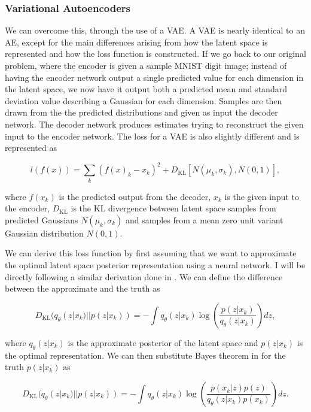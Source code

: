 %
%
\subsubsection{Variational Autoencoders}

We can overcome this, through the use of a \ac{VAE}. 
A \ac{VAE} is nearly identical to an \ac{AE}, except for 
the main differences arising from how the latent space 
is represented and how the loss function is constructed. 
If we go back to our original problem, where the encoder is given 
a sample MNIST digit image; instead of having the encoder network 
output a single predicted value for each dimension in the 
latent space, we now have it output both a predicted 
mean and standard deviation value describing a Gaussian 
for each dimension. Samples are then drawn from the the 
predicted distributions and given as input the decoder network. 
The decoder network produces estimates trying to reconstruct 
the given input to the encoder network. The loss for 
a \ac{VAE} is also slightly different and is represented 
as 

\begin{equation}
    l(f(x)) = \sum_k{ (f(x)_k - x_k)^2 + 
    D_{\textrm{KL}}[N(\mu_k, \sigma_k), N(0, 1)]},
\end{equation}

where $f(x_k)$ is the predicted output from the decoder, $x_k$
is the given input to the encoder, $D_{\textrm{KL}}$ is the \ac{KL} divergence 
between latent space samples from predicted Gaussians $N(\mu_k, \sigma_k)$ 
and samples from a mean zero unit variant Gaussian 
distribution $N(0,1)$. 

We can derive this loss function by first assuming that we 
want to approximate the optimal latent space posterior 
representation using a neural network. I will be directly following a 
similar derivation done in \cite{1907.08956}. We can define the 
difference between the approximate and the truth as 

\begin{equation}
    D_{\textrm{KL}}(q_{\theta}(z|x_k) || p(z|x_k)) = -\int q_{\theta}(z|x_k) \log(\frac{p(z|x_k)}{q_{\theta}(z|x_k)}) dz,
\end{equation}

where $q_{\theta}(z|x_k)$ is the approximate posterior of the 
latent space and $p(z|x_k)$ is the optimal representation. 
We can then substitute Bayes theorem in for the truth 
$p(z|x_k)$ as 

\begin{equation}
    D_{\textrm{KL}}(q_{\theta}(z|x_k) || p(z|x_k)) = -\int q_{\theta}(z|x_k) 
    \log(\frac{p(x_k|z) p(z)}{q_{\theta}(z|x_k) p(x_k)}) dz. 
\end{equation}

